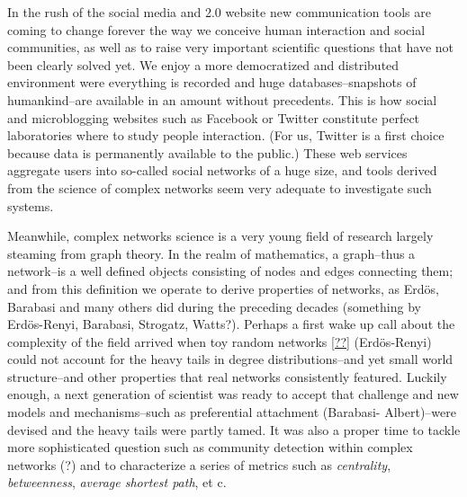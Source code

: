 \documentclass[12pt]{article}
\begin{document}



In the rush of the social media and 2.0 website new communication tools are coming to change
forever the way we conceive human interaction and social communities, as well as to raise very
important scientific questions that have not been clearly solved yet. We enjoy a more democratized
and distributed environment were everything is recorded and huge databases--snapshots of 
humankind--are available in an amount without precedents. This is how social and microblogging
websites such as Facebook or Twitter constitute perfect laboratories where to study people
interaction. (For us, Twitter is a first choice because data is permanently available to the
public.) These web services aggregate users into so-called social networks of a huge size, and tools
derived from the science of complex networks seem very adequate to investigate such systems.

    Meanwhile, complex networks science is a very young field of research largely steaming from
graph theory. In the realm of mathematics, a graph--thus a  network--is a well defined objects
consisting of nodes and edges connecting them; and from this definition we operate to derive
properties of networks, as Erd\"os, Barabasi and many others did during the preceding decades
\cite{??}(something by Erd\"os-Renyi, Barabasi, Strogatz, Watts?). Perhaps a first wake up call
about the complexity of the field arrived when toy random networks \ref{??} (Erd\"os-Renyi) could
not account for the heavy tails in degree distributions--and yet small world structure--and other
properties that real networks consistently featured. Luckily enough, a next generation of scientist
was ready to accept that challenge and new models and mechanisms--such as preferential attachment
\cite{} (Barabasi- Albert)--were devised and the heavy tails were partly tamed. It was also a proper
time to tackle more sophisticated question such as community detection within complex networks
\cite{??} (?) and to characterize a series of metrics such as \emph{centrality}, \emph{betweenness},
\emph{average shortest path}, et c.
\end{document}
